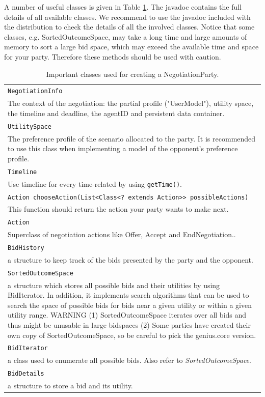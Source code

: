 \documentclass[]{llncs}
\begin{document}
A number of useful classes is given in Table \ref{tab:agentclass}. The javadoc contains the full details of all available classes. We recommend to use the javadoc included with the distribution to check the details of all the involved classes.  Notice that some classes, e.g. SortedOutcomeSpace, may take a long time and large amounts of memory to sort a large bid space, which may exceed the available time and space for your party. Therefore these methods should be used with caution.

\begin{table}
\begin{tabular}{m{}}
\hline
\texttt{NegotiationInfo}\\
The context of the negotiation: the partial profile ("UserModel"), utility space, the timeline and deadline, the agentID and persistent data container.\\
\hline
\texttt{UtilitySpace}\\
The preference profile of the scenario allocated to the party. It is recommended to use this class when implementing a model of the opponent's preference profile.\\
\hline
\texttt{Timeline }\\
Use timeline for every time-related by using \texttt{getTime()}.\\
\texttt{Action chooseAction(List<Class<? extends Action>> possibleActions)}\\
This function should return the action your party wants to make next.\\
\hline
\texttt{Action}\\
Superclass of negotiation actions like Offer, Accept and EndNegotiation..\\
\hline
\texttt{BidHistory}\\
a structure to keep track of the bids presented by the party and the opponent.\\
\hline
\texttt{SortedOutcomeSpace}\\
a structure which stores all possible bids and their utilities by using BidIterator. In addition, it implements search algorithms that can be used to search the space of possible bids for bids near a given utility or within a given utility range. WARNING (1) SortedOutcomeSpace iterates over all bids and thus might be unusable in large bidspaces (2) Some parties have created their own copy of SortedOutcomeSpace, so be careful to pick the genius.core version. \\
\hline
\texttt{BidIterator}\\
a class used to enumerate all possible bids. Also refer to \textit{SortedOutcomeSpace}.\\
\hline
\texttt{BidDetails}\\
a structure to store a bid and its utility.\\
\hline
\end{tabular}

\caption{Important classes used for creating a NegotiationParty.}
\label{tab:agentclass}
\end{table}
\end{document}
